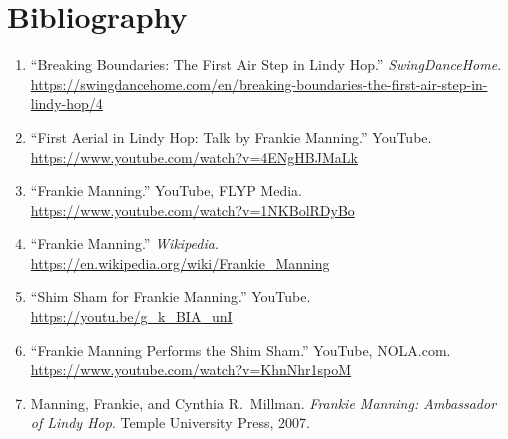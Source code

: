 \documentclass[12pt]{article}
\begin{document}
\section*{Bibliography}
\begin{enumerate}
  \item ``Breaking Boundaries: The First Air Step in Lindy Hop.'' \emph{SwingDanceHome}.\\
        \url{https://swingdancehome.com/en/breaking-boundaries-the-first-air-step-in-lindy-hop/4}
  \item ``First Aerial in Lindy Hop: Talk by Frankie Manning.'' YouTube.\\
        \url{https://www.youtube.com/watch?v=4ENgHBJMaLk}
  \item ``Frankie Manning.'' YouTube, FLYP Media.\\
        \url{https://www.youtube.com/watch?v=1NKBolRDyBo}
  \item ``Frankie Manning.'' \emph{Wikipedia}.\\
        \url{https://en.wikipedia.org/wiki/Frankie_Manning}
  \item ``Shim Sham for Frankie Manning.'' YouTube.\\
        \url{https://youtu.be/g_k_BIA_unI}
  \item ``Frankie Manning Performs the Shim Sham.'' YouTube, NOLA.com.\\
        \url{https://www.youtube.com/watch?v=KhnNhr1spoM}
  \item Manning, Frankie, and Cynthia R.\ Millman. \emph{Frankie Manning: Ambassador of Lindy Hop}. Temple University Press, 2007.
\end{enumerate}
\end{document}

